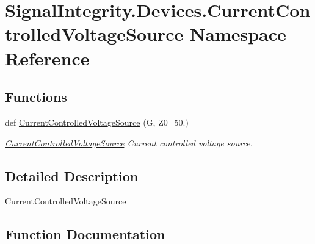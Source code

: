 \hypertarget{namespaceSignalIntegrity_1_1Devices_1_1CurrentControlledVoltageSource}{}\section{Signal\+Integrity.\+Devices.\+Current\+Controlled\+Voltage\+Source Namespace Reference}
\label{namespaceSignalIntegrity_1_1Devices_1_1CurrentControlledVoltageSource}
\subsection*{Functions}
\begin{DoxyCompactItemize}
\item 
def \hyperlink{namespaceSignalIntegrity_1_1Devices_1_1CurrentControlledVoltageSource_a32fe75a8d6da8de41ea8a03a695a8e16}{Current\+Controlled\+Voltage\+Source} (G, Z0=50.)
\begin{DoxyCompactList}\small\item\em \hyperlink{namespaceSignalIntegrity_1_1Devices_1_1CurrentControlledVoltageSource}{Current\+Controlled\+Voltage\+Source} Current controlled voltage source. \end{DoxyCompactList}\end{DoxyCompactItemize}


\subsection{Detailed Description}
\begin{DoxyVerb}CurrentControlledVoltageSource\end{DoxyVerb}
 

\subsection{Function Documentation}
\mbox{\label{namespaceSignalIntegrity_1_1Devices_1_1CurrentControlledVoltageSource_a32fe75a8d6da8de41ea8a03a695a8e16}} 
